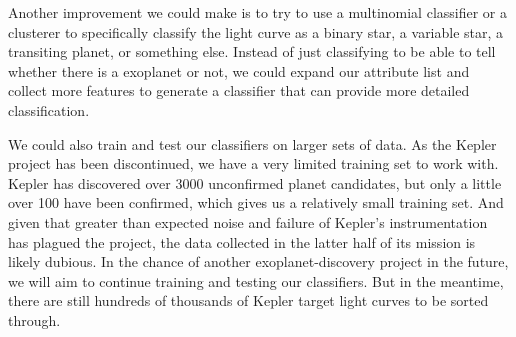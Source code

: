 \documentclass{amsart}
\begin{document}
Another improvement we could make is to try to use a multinomial classifier or a clusterer to specifically classify the light curve as a binary star, a variable star, a transiting planet, or something else. Instead of just classifying to be able to tell whether there is a exoplanet or not, we could expand our attribute list and collect more features to generate a classifier that can provide more detailed classification. 

We could also train and test our classifiers on larger sets of data. As the Kepler project has been discontinued, we have a very limited training set to work with. Kepler has discovered over 3000 unconfirmed planet candidates, but only a little over 100 have been confirmed, which gives us a relatively small training set. And given that greater than expected noise and failure of Kepler's instrumentation has plagued the project, the data collected in the latter half of its mission is likely dubious.  In the chance of another exoplanet-discovery project in the future, we will aim to continue training and testing our classifiers. But in the meantime, there are still hundreds of thousands of Kepler target light curves to be sorted through.
\end{document}
